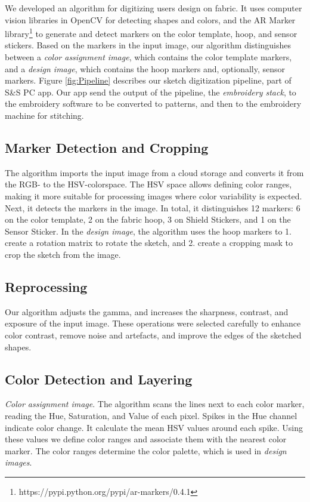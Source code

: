 


We developed an algorithm for digitizing users design on fabric. It uses computer vision libraries in OpenCV for detecting shapes and colors, and the AR Marker library\footnote{https://pypi.python.org/pypi/ar-markers/0.4.1} to generate and detect markers on the color template, hoop, and sensor stickers. Based on the markers in the input image, our algorithm distinguishes between a \textit{color assignment image}, which contains the color template markers, and a \textit{design image}, which contains the hoop markers and, optionally, sensor markers. Figure \ref{fig:Pipeline} describes our sketch digitization pipeline, part of S\&S PC app. Our app send the output of the pipeline, the \textit{embroidery stack}, to the embroidery software to be converted to patterns, and then to the embroidery machine for stitching. %


\subsection{Marker Detection and Cropping}
The algorithm imports the input image from a cloud storage and converts it from the RGB- to the HSV-colorspace. The HSV space allows defining color ranges, making it more suitable for processing images where color variability is expected. Next, it detects the markers in the image. In total, it distinguishes 12 markers: 6 on the color template, 2 on the fabric hoop, 3 on Shield Stickers, and 1 on the Sensor Sticker. In the \textit{design image}, the algorithm uses the hoop markers to 1. create a rotation matrix to rotate the sketch, and 2. create a cropping mask to crop the sketch from the image. 

\subsection{Reprocessing}
Our algorithm adjusts the gamma, and increases the sharpness, contrast, and exposure of the input image. These operations were selected carefully to enhance color contrast, remove noise and artefacts, and improve the edges of the sketched shapes. 


\subsection{Color Detection and Layering}
\textit{Color assignment image}. The algorithm scans the lines next to each color marker, reading the Hue, Saturation, and Value of each pixel. Spikes in the Hue channel indicate color change. It calculate the mean HSV values around each spike. Using these values we define color ranges and associate them with the nearest color marker. The color ranges determine the color palette, which is used in \textit{design images}. 


